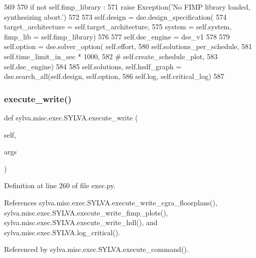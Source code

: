 \begin{DoxyCode}
569 
570       \textcolor{keywordflow}{if} \textcolor{keywordflow}{not} self.fimp\_library :
571         \textcolor{keywordflow}{raise} Exception(\textcolor{stringliteral}{'No FIMP library loaded, synthesizing abort.'})
572 
573       self.design = dse.design\_specification(
574         target\_architecture = self.target\_architecture,
575         system = self.system, fimp\_lib = self.fimp\_library)
576 
577     self.dse\_engine = dse\_v1
578 
579     self.option = dse.solver\_option( self.effort,
580                               self.solutions\_per\_schedule,
581                               self.time\_limit\_in\_sec * 1000,
582                               \textcolor{comment}{# self.create\_schedule\_plot,}
583                               self.dse\_engine)
584 
585     self.solutions, self.hsdf\_graph = dse.search\_all(self.design, self.option,
586       self.log, self.critical\_log)
587 
\end{DoxyCode}
\mbox{\label{classsylva_1_1misc_1_1exec_1_1_s_y_l_v_a_a395e3cd0c375c051762dd035dbbfe9b4}} 
\subsubsection{\texorpdfstring{execute\+\_\+write()}{execute\_write()}}
{\footnotesize\ttfamily def sylva.\+misc.\+exec.\+S\+Y\+L\+V\+A.\+execute\+\_\+write (\begin{DoxyParamCaption}\item[{}]{self,  }\item[{}]{args }\end{DoxyParamCaption})}



Definition at line 260 of file exec.\+py.



References sylva.\+misc.\+exec.\+S\+Y\+L\+V\+A.\+execute\+\_\+write\+\_\+cgra\+\_\+floorplans(), sylva.\+misc.\+exec.\+S\+Y\+L\+V\+A.\+execute\+\_\+write\+\_\+fimp\+\_\+plots(), sylva.\+misc.\+exec.\+S\+Y\+L\+V\+A.\+execute\+\_\+write\+\_\+hdl(), and sylva.\+misc.\+exec.\+S\+Y\+L\+V\+A.\+log\+\_\+critical().



Referenced by sylva.\+misc.\+exec.\+S\+Y\+L\+V\+A.\+execute\+\_\+command().


